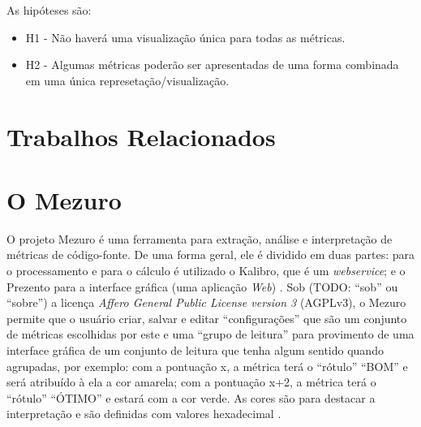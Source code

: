 As hipóteses são:

\begin{itemize}
  \item H1 - Não haverá uma visualização única para todas as métricas.
  \item H2 - Algumas métricas poderão ser apresentadas de uma forma combinada
  em uma única represetação/visualização.
\end{itemize}


\section{Trabalhos Relacionados}

\section{O Mezuro}

O projeto Mezuro é uma ferramenta para extração, análise e interpretação de
métricas de código-fonte. De uma forma geral, ele é dividido em duas partes:
para o processamento e para o cálculo é utilizado o Kalibro, que é um
\textit{webservice}; e o Prezento para a interface gráfica (uma aplicação
\textit{Web}) \cite{meirellesCibse2015}. Sob (TODO: ``sob'' ou ``sobre'') a licença
\textit{Affero General Public License version 3} (AGPLv3), o Mezuro permite que
o usuário criar, salvar e editar ``configurações'' que são um conjunto de
métricas escolhidas por este e uma ``grupo de leitura'' para provimento de uma
interface gráfica de um conjunto de leitura que tenha algum sentido quando
agrupadas, por exemplo: com a pontuação x, a métrica terá o ``rótulo'' ``BOM'' e
será atribuído à ela a cor amarela; com a pontuação x+2, a métrica terá o 
``rótulo'' ``ÓTIMO'' e estará com a cor verde. As cores são para destacar a
interpretação e são definidas com valores hexadecimal \cite{camarinhaOSS2015}.

